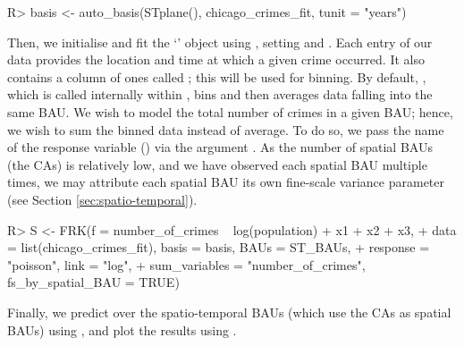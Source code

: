\documentclass[article]{jss}
\newcommand{\class}[1]{`\code{#1}'}
\newcommand{\fct}[1]{\code{#1()}}
\begin{document}
\begin{Code}
R> basis <- auto_basis(STplane(), chicago_crimes_fit, tunit = "years")
\end{Code}
Then, we initialise and fit the \class{SRE} object using \fct{FRK}, setting  and . 
 Each entry of our data provides the location and time at which a given crime occurred. It also contains a column of ones called ; this will be used for binning. 
 By default, \fct{SRE}, which is called internally within \fct{FRK}, bins and then averages data falling into the same BAU. 
 We wish to model the total number of crimes in a given BAU; hence, we wish to sum the binned data instead of average. To do so, we pass the name of the response variable () via the argument .
As the number of spatial BAUs (the CAs) is relatively low, and we have observed each spatial BAU multiple times, we may attribute each spatial BAU its own fine-scale variance parameter (see Section \ref{sec:spatio-temporal}). %
\begin{Code}
R> S <- FRK(f = number_of_crimes ~ log(population) + x1 + x2 + x3,   
+    data = list(chicago_crimes_fit), basis = basis, BAUs = ST_BAUs,         
+    response = "poisson", link = "log", 
+    sum_variables = "number_of_crimes", fs_by_spatial_BAU = TRUE) 
\end{Code}
Finally, we predict over the spatio-temporal BAUs (which use the CAs as spatial BAUs) using \fct{predict}, and plot the results using \fct{plot}.
%
%
%                  
\end{document}
